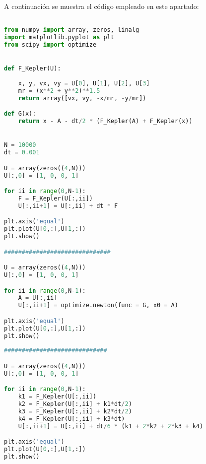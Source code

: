 
A continuación se muestra el código empleado en este apartado:

\begin{lstlisting}[language=Python, caption=Código del Hito 1, label=Hito_1_code]

from numpy import array, zeros, linalg
import matplotlib.pyplot as plt
from scipy import optimize


def F_Kepler(U):
    
    x, y, vx, vy = U[0], U[1], U[2], U[3]
    mr = (x**2 + y**2)**1.5
    return array([vx, vy, -x/mr, -y/mr])

def G(x):
    return x - A - dt/2 * (F_Kepler(A) + F_Kepler(x))


N = 10000
dt = 0.001

U = array(zeros((4,N)))
U[:,0] = [1, 0, 0, 1]

for ii in range(0,N-1):
    F = F_Kepler(U[:,ii])
    U[:,ii+1] = U[:,ii] + dt * F

plt.axis('equal')
plt.plot(U[0,:],U[1,:])
plt.show()

##############################

U = array(zeros((4,N)))
U[:,0] = [1, 0, 0, 1]

for ii in range(0,N-1):
    A = U[:,ii]
    U[:,ii+1] = optimize.newton(func = G, x0 = A)

plt.axis('equal')
plt.plot(U[0,:],U[1,:])
plt.show()
    
#############################

U = array(zeros((4,N)))
U[:,0] = [1, 0, 0, 1]

for ii in range(0,N-1):
    k1 = F_Kepler(U[:,ii])
    k2 = F_Kepler(U[:,ii] + k1*dt/2)
    k3 = F_Kepler(U[:,ii] + k2*dt/2)
    k4 = F_Kepler(U[:,ii] + k3*dt)
    U[:,ii+1] = U[:,ii] + dt/6 * (k1 + 2*k2 + 2*k3 + k4)

plt.axis('equal')
plt.plot(U[0,:],U[1,:])
plt.show()

\end{lstlisting}














